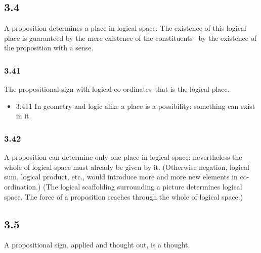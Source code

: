 \documentclass[11pt]{article}
\begin{document}
\subsection*{3.4}
\label{sec:orgdc41dba}
A proposition determines a place in logical space. The existence of
this logical place is guaranteed by the mere existence of the constituents--
by the existence of the proposition with a sense.
\subsubsection*{3.41}
\label{sec:orgce973e9}
The propositional sign with logical co-ordinates--that is the logical
place.
\begin{itemize}
\item 3.411
\label{sec:org66068a4}
In geometry and logic alike a place is a possibility: something can
exist in it.
\end{itemize}
\subsubsection*{3.42}
\label{sec:org9c01a7e}
A proposition can determine only one place in logical space:
nevertheless the whole of logical space must already be given by it.
(Otherwise negation, logical sum, logical product, etc., would introduce
more and more new elements in co-ordination.) (The logical scaffolding
surrounding a picture determines logical space. The force of a proposition
reaches through the whole of logical space.)
\subsection*{3.5}
\label{sec:orgd5db521}
A propositional sign, applied and thought out, is a thought.
\end{document}
